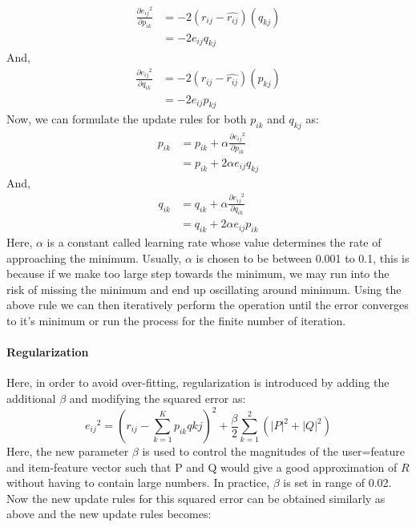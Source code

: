 \begin{equation}
\begin{split}
	\frac{\partial {e_{ij}}^2}{\partial p_{ik}} & = -2(r_{ij}-\widehat{r_{ij}})(q_{kj}) \\
	& = -2e_{ij}q_{kj}
\end{split}
\end{equation}
And,
\begin{equation}
\begin{split}
	\frac{\partial {e_{ij}}^2}{\partial q_{ik}} & = -2(r_{ij}-\widehat{r_{ij}})(p_{kj}) \\
	& = -2e_{ij}p_{kj}
\end{split}
\end{equation}
Now, we can formulate the update rules for both $p_{ik}$ and $q_{kj} $ as:
\begin{equation}
\begin{split}
	p_{ik} &= p_{ik} + \alpha \frac{\partial {e_{ij}}^2}{\partial p_{ik}} \\
	& = p_{ik}  + 2\alpha e_{ij} q_{kj}
\end{split}
\end{equation}
And,
\begin{equation}
\begin{split}
	q_{ik} &= q_{ik} + \alpha \frac{\partial {e_{ij}}^2}{\partial q_{ik}} \\
	& = q_{ik}  + 2\alpha e_{ij} p_{ik}
\end{split}
\end{equation}
Here, $\alpha$ is a constant called learning rate whose value determines the rate of approaching the minimum. Usually, $\alpha$ is chosen to be between 0.001 to 0.1, this is because if we make too large step towards the minimum, we may run into the risk of missing the minimum and end up oscillating around minimum.
Using the above rule we can then iteratively perform the operation until the error converges to it's minimum or run the process for the finite number of iteration.
\paragraph{Regularization}\hfill

Here, in order to avoid over-fitting, regularization is introduced by adding the additional $\beta$ and modifying the squared error as:
\begin{equation}
	{e_{ij}}^2  = (r_{ij} - \sum_{k=1}^K p_{ik}q{kj})^2 + \frac{\beta}{2}\sum_{k=1}^2(|P|^2 + |Q|^2)
\end{equation}
Here, the new parameter $\beta$ is used to control the magnitudes of the user=feature and item-feature vector such that P and Q would give a good approximation of $R$ without having to contain large numbers. In practice, $\beta$ is set in range of 0.02. Now the new update rules for this squared error can be obtained similarly as above and the new update rules becomes:


